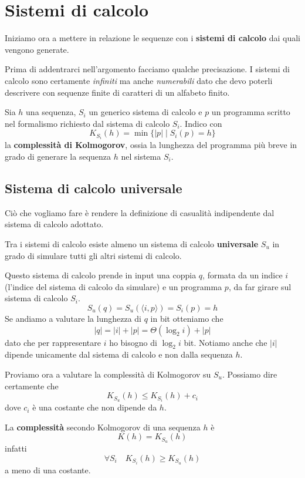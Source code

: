 \section{Sistemi di calcolo}\label{sistemi_calcolo}
Iniziamo ora a mettere in relazione le sequenze con i \textbf{sistemi di calcolo} dai quali vengono generate.

Prima di addentrarci nell'argomento facciamo qualche precisazione. I sistemi di calcolo sono certamente \emph{infiniti}
ma anche \emph{numerabili} dato che devo poterli descrivere con sequenze finite di caratteri di un alfabeto finito.

\begin{definition}
	Sia $h$ una sequenza, $S_i$ un generico sistema di calcolo e $p$ un programma scritto nel formalismo richiesto dal
	sistema di calcolo $S_i$. Indico con
	\[ K_{S_i}(h) = \min\{ |p| \mid S_i(p) = h \} \]
	la \textbf{complessit\`a di Kolmogorov}, ossia la lunghezza del programma pi\`u breve in grado di generare la
	sequenza $h$ nel sistema $S_i$.
\end{definition}

\subsection{Sistema di calcolo universale}
Ci\`o che vogliamo fare \`e rendere la definizione di casualit\`a indipendente dal sistema di calcolo adottato.

Tra i sistemi di calcolo esiste almeno un sistema di calcolo \textbf{universale} $S_u$ in grado di simulare tutti gli
altri sistemi di calcolo.

Questo sistema di calcolo prende in input una coppia $q$, formata da un indice $i$ (l'indice del sistema di calcolo da
simulare) e un programma $p$, da far girare sul sistema di calcolo $S_i$.
\[ S_u(q) =  S_u (\langle i, p \rangle) = S_i (p) = h \]
Se andiamo a valutare la lunghezza di $q$ in bit otteniamo che
\[ |q| = |i| + |p| = \Theta (\log_2 i) + |p| \]
dato che per rappresentare $i$ ho bisogno di $\log_2 i$ bit. Notiamo anche che $|i|$ dipende unicamente dal sistema di
calcolo e non dalla sequenza $h$.

Proviamo ora a valutare la complessit\`a di Kolmogorov su $S_u$. Possiamo dire certamente che
\[ K_{S_u}(h) \leq K_{S_i}(h) + c_i \]
dove $c_i$ \`e una costante che non dipende da $h$.

\begin{definition}
	La \textbf{complessit\`a} secondo Kolmogorov di una sequenza $h$ \`e
	\[ K(h) = K_{S_u}(h) \]
	infatti
	\[ \forall S_i \quad K_{S_i}(h) \geq K_{S_u}(h) \]
	a meno di una costante.
\end{definition}

